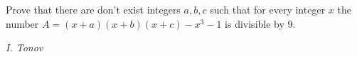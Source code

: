 Prove that there are don't exist integers $a,b,c$ such that for every integer $x$ the number $A=(x+a)(x+b)(x+c)-x^3-1$ is divisible by $9$.

\textit{I. Tonov}